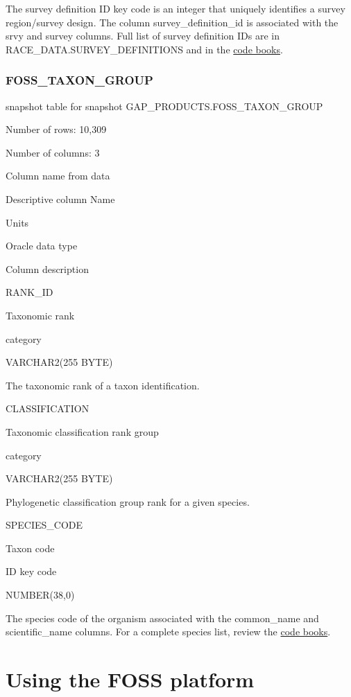 \documentclass[
  letterpaper,
  oneside,
  open=any]{scrbook}
\begin{document}
The survey definition ID key code is an integer that uniquely identifies
a survey region/survey design. The column survey\_definition\_id is
associated with the srvy and survey columns. Full list of survey
definition IDs are in RACE\_DATA.SURVEY\_DEFINITIONS and in the
\href{https://www.fisheries.noaa.gov/resource/document/groundfish-survey-species-code-manual-and-data-codes-manual}{code
books}.

\subsection{FOSS\_TAXON\_GROUP}\label{foss_taxon_group}

snapshot table for snapshot GAP\_PRODUCTS.FOSS\_TAXON\_GROUP

Number of rows: 10,309

Number of columns: 3

Column name from data

Descriptive column Name

Units

Oracle data type

Column description

RANK\_ID

Taxonomic rank

category

VARCHAR2(255 BYTE)

The taxonomic rank of a taxon identification.

CLASSIFICATION

Taxonomic classification rank group

category

VARCHAR2(255 BYTE)

Phylogenetic classification group rank for a given species.

SPECIES\_CODE

Taxon code

ID key code

NUMBER(38,0)

The species code of the organism associated with the common\_name and
scientific\_name columns. For a complete species list, review the
\href{https://www.fisheries.noaa.gov/resource/document/groundfish-survey-species-code-manual-and-data-codes-manual}{code
books}.

\chapter{Using the FOSS platform}\label{using-the-foss-platform}
\end{document}
